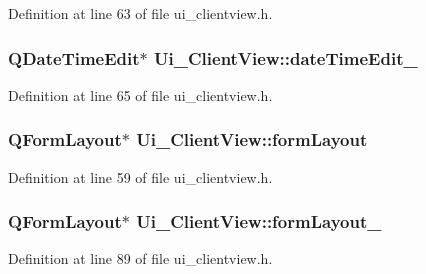 Definition at line 63 of file ui\+\_\+clientview.\+h.

\hypertarget{class_ui___client_view_a5da3b627c41c81ffd0cee3714f85bdfa}{}
\subsubsection[{date\+Time\+Edit\+\_\+2}]{\setlength{\rightskip}{0pt plus 5cm}Q\+Date\+Time\+Edit$\ast$ Ui\+\_\+\+Client\+View\+::date\+Time\+Edit\+\_}\label{class_ui___client_view_a5da3b627c41c81ffd0cee3714f85bdfa}


Definition at line 65 of file ui\+\_\+clientview.\+h.

\hypertarget{class_ui___client_view_aeb4ca2ecc409a09602ed2d98d124a65f}{}
\subsubsection[{form\+Layout}]{\setlength{\rightskip}{0pt plus 5cm}Q\+Form\+Layout$\ast$ Ui\+\_\+\+Client\+View\+::form\+Layout}\label{class_ui___client_view_aeb4ca2ecc409a09602ed2d98d124a65f}


Definition at line 59 of file ui\+\_\+clientview.\+h.

\hypertarget{class_ui___client_view_af2f66295a6521df9db16aa0412f6836d}{}
\subsubsection[{form\+Layout\+\_\+2}]{\setlength{\rightskip}{0pt plus 5cm}Q\+Form\+Layout$\ast$ Ui\+\_\+\+Client\+View\+::form\+Layout\+\_}\label{class_ui___client_view_af2f66295a6521df9db16aa0412f6836d}


Definition at line 89 of file ui\+\_\+clientview.\+h.

\hypertarget{class_ui___client_view_ab9f0b12942ece16be12503604c116b74}{}
